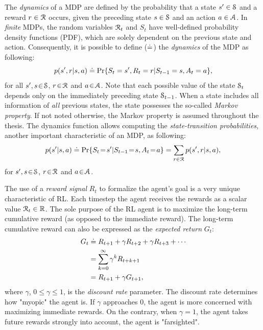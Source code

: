 \documentclass[a4paper, twoside, 12pt]{article}
\begin{document}
The \emph{dynamics} of a MDP are defined by the probability that a state \(s'\in \S\)
and a reward \(r\in\R\) occurs, given the preceding state \(s\in\S\) and an action
\(a\in\A\). In \emph{finite} MDPs, the random variables \(\R_t\) and \(S_t\) have
well-defined probability density functions (PDF), which are solely dependent on
the previous state and action. Consequently, it is possible to define (\(\defeq\))
the \emph{dynamics} of the MDP as following:
\begin{equation} \label{eq-dynamics}
    p(s',r|s,a) \defeq \Pr{S_t=s',R_t=r|S_{t-1}=s,A_t=a},
\end{equation}
for all \(s',s\!\in\!\S\), \(r\!\in\!\R\) and \(a\!\in\!\A\). Note that each possible value of
the state \(\S_t\) depends only on the immediately preceding state \(\S_{t-1}\).
When a state includes all information of \emph{all} previous states, the state
possesses the so-called \emph{Markov property}. If not noted otherwise, the Markov
property is assumed throughout the thesis.
The dynamics function allows computing the \emph{state-transition probabilities},
another important characteristic of an MDP, as following:
\begin{equation} \label{eq-state-transition}
    p(s'|s,a) \defeq \Pr{S_t\!=\!s'|S_{t-1}\!=\!s,A_t\!=\!a} = \sum_{r\in\R}{p(s', r|s, a)},
\end{equation}
for \(s',s\!\in\!\S\), \(r\!\in\!\R\) and \(a\!\in\!\A\).

The use of a \emph{reward signal} \(R_t\) to formalize the agent's goal is a very
unique characteristic of RL. Each timestep the agent receives the rewards as a scalar
value \(\R_t\in\Re\). The sole purpose of the RL agent is to maximize the
long-term cumulative reward (as opposed to the immediate reward). The long-term
cumulative reward can also be expressed as the \emph{expected return} \(G_t\):
\begin{equation} \label{eq-expected-return}
\begin{split}
    G_t &\defeq R_{t+1} + \gamma R_{t+2} + \gamma R_{t+3} + \cdots \\
    &= \sum_{k=0}^{\infty}{\gamma^k R_{t+k+1}} \\
    &= R_{t+1} + \gamma G_{t+1},
\end{split}
\end{equation}
where \(\gamma\), \(0\leq\gamma\leq 1\), is the \emph{discount rate} parameter. The
discount rate determines how "myopic" the agent is. If \(\gamma\) approaches 0,
the agent is more concerned with maximizing immediate rewards. On the contrary,
when \(\gamma\!=\! 1\), the agent takes future rewards strongly into account, the
agent is "farsighted".
\end{document}
